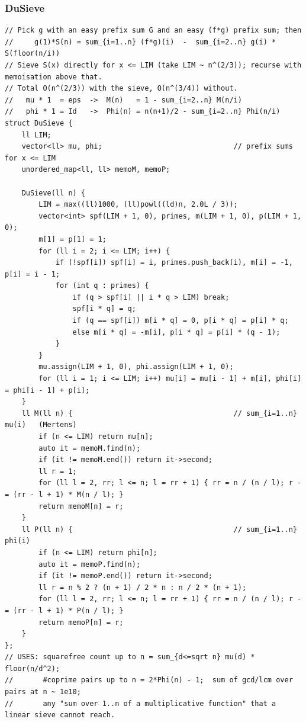 \documentclass[9pt,a4paper,twocolumn]{extarticle}
\begin{document}
\filbreak
\subsubsection{DuSieve}
\nopagebreak
\begin{lstlisting}
// Pick g with an easy prefix sum G and an easy (f*g) prefix sum; then
//     g(1)*S(n) = sum_{i=1..n} (f*g)(i)  -  sum_{i=2..n} g(i) * S(floor(n/i))
// Sieve S(x) directly for x <= LIM (take LIM ~ n^(2/3)); recurse with memoisation above that.
// Total O(n^(2/3)) with the sieve, O(n^(3/4)) without.
//   mu * 1  = eps  ->  M(n)   = 1 - sum_{i=2..n} M(n/i)
//   phi * 1 = Id   ->  Phi(n) = n(n+1)/2 - sum_{i=2..n} Phi(n/i)
struct DuSieve {
    ll LIM;
    vector<ll> mu, phi;                               // prefix sums for x <= LIM
    unordered_map<ll, ll> memoM, memoP;

    DuSieve(ll n) {
        LIM = max((ll)1000, (ll)powl((ld)n, 2.0L / 3));
        vector<int> spf(LIM + 1, 0), primes, m(LIM + 1, 0), p(LIM + 1, 0);
        m[1] = p[1] = 1;
        for (ll i = 2; i <= LIM; i++) {
            if (!spf[i]) spf[i] = i, primes.push_back(i), m[i] = -1, p[i] = i - 1;
            for (int q : primes) {
                if (q > spf[i] || i * q > LIM) break;
                spf[i * q] = q;
                if (q == spf[i]) m[i * q] = 0, p[i * q] = p[i] * q;
                else m[i * q] = -m[i], p[i * q] = p[i] * (q - 1);
            }
        }
        mu.assign(LIM + 1, 0), phi.assign(LIM + 1, 0);
        for (ll i = 1; i <= LIM; i++) mu[i] = mu[i - 1] + m[i], phi[i] = phi[i - 1] + p[i];
    }
    ll M(ll n) {                                      // sum_{i=1..n} mu(i)   (Mertens)
        if (n <= LIM) return mu[n];
        auto it = memoM.find(n);
        if (it != memoM.end()) return it->second;
        ll r = 1;
        for (ll l = 2, rr; l <= n; l = rr + 1) { rr = n / (n / l); r -= (rr - l + 1) * M(n / l); }
        return memoM[n] = r;
    }
    ll P(ll n) {                                      // sum_{i=1..n} phi(i)
        if (n <= LIM) return phi[n];
        auto it = memoP.find(n);
        if (it != memoP.end()) return it->second;
        ll r = n % 2 ? (n + 1) / 2 * n : n / 2 * (n + 1);
        for (ll l = 2, rr; l <= n; l = rr + 1) { rr = n / (n / l); r -= (rr - l + 1) * P(n / l); }
        return memoP[n] = r;
    }
};
// USES: squarefree count up to n = sum_{d<=sqrt n} mu(d) * floor(n/d^2);
//       #coprime pairs up to n = 2*Phi(n) - 1;  sum of gcd/lcm over pairs at n ~ 1e10;
//       any "sum over 1..n of a multiplicative function" that a linear sieve cannot reach.
\end{lstlisting}
\end{document}
